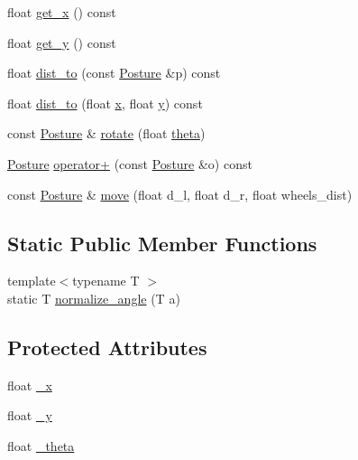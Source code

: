 \begin{DoxyCompactItemize}
\item 
float \hyperlink{classfastsim_1_1_posture_a7aedd5ad695d28120e32233131fe6dac}{get\+\_\+x} () const 
\item 
float \hyperlink{classfastsim_1_1_posture_a03e902104e8022add96e425fed7fb9be}{get\+\_\+y} () const 
\item 
float \hyperlink{classfastsim_1_1_posture_a4e55431de5f384f046f2a02b6b92df38}{dist\+\_\+to} (const \hyperlink{classfastsim_1_1_posture}{Posture} \&p) const 
\item 
float \hyperlink{classfastsim_1_1_posture_ad6e4aa68961e0ddf65c6a4d556445203}{dist\+\_\+to} (float \hyperlink{classfastsim_1_1_posture_a1c425e41c372d755af560f33c0687a04}{x}, float \hyperlink{classfastsim_1_1_posture_adcda5bd483be5848fea3a384cb2b3b15}{y}) const 
\item 
const \hyperlink{classfastsim_1_1_posture}{Posture} \& \hyperlink{classfastsim_1_1_posture_aa24b35b636b64968e4558c0621b93e63}{rotate} (float \hyperlink{classfastsim_1_1_posture_a3b1341321c79dd22e0a912292e9b4e92}{theta})
\item 
\hyperlink{classfastsim_1_1_posture}{Posture} \hyperlink{classfastsim_1_1_posture_a72132633a4d73afac1efcad866b3fe00}{operator+} (const \hyperlink{classfastsim_1_1_posture}{Posture} \&o) const 
\item 
const \hyperlink{classfastsim_1_1_posture}{Posture} \& \hyperlink{classfastsim_1_1_posture_a885b4f62c4c76494a6274c75dc1270c3}{move} (float d\+\_\+l, float d\+\_\+r, float wheels\+\_\+dist)
\end{DoxyCompactItemize}
\subsection*{Static Public Member Functions}
\begin{DoxyCompactItemize}
\item 
{\footnotesize template$<$typename T $>$ }\\static T \hyperlink{classfastsim_1_1_posture_a474ae244803f2a0212f9c2e8f164468b}{normalize\+\_\+angle} (T a)
\end{DoxyCompactItemize}
\subsection*{Protected Attributes}
\begin{DoxyCompactItemize}
\item 
float \hyperlink{classfastsim_1_1_posture_a90ed276ab17e35e9b137b1d57104694c}{\+\_\+x}
\item 
float \hyperlink{classfastsim_1_1_posture_a147bf9a8c294c750b0a58e7178c35224}{\+\_\+y}
\item 
float \hyperlink{classfastsim_1_1_posture_a893e46c38a389c8a31f5f37695720886}{\+\_\+theta}
\end{DoxyCompactItemize}


